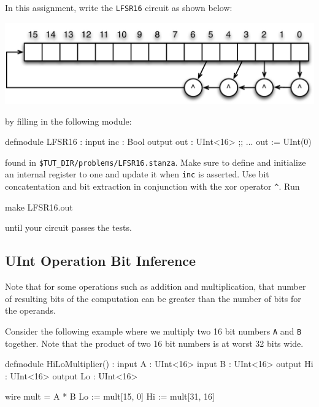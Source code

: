 \subsection{}

In this assignment, write the \verb+LFSR16+ circuit as shown below:

\begin{center}
\includegraphics[width=0.9\columnwidth]{../bootcamp/figs/LFSR16.pdf}
\end{center}

\noindent
by filling in the following module:

\begin{stanza}
defmodule LFSR16 :
  input  inc : Bool
  output out : UInt<16>
  ;; ...
  out := UInt(0)
\end{stanza}

\noindent
found in \verb+$TUT_DIR/problems/LFSR16.stanza+.
Make sure to define and initialize an internal register to one and 
update it when \verb+inc+ is asserted.
Use bit concatentation and bit extraction 
in conjunction with the xor operator \verb+^+.  Run 

\begin{bash}
make LFSR16.out
\end{bash}

\noindent 
until your circuit passes the tests.

\subsection{UInt Operation Bit Inference}

Note that for some operations such as addition and multiplication, that number of resulting bits of the computation can be greater than the number of bits for the operands. 

Consider the following example where we multiply two 16 bit numbers \verb+A+ and \verb+B+ together. Note that the product of two 16 bit numbers is at worst 32 bits wide.

\begin{stanza}
defmodule HiLoMultiplier() :
  input A   : UInt<16>
  input B   : UInt<16>
  output Hi : UInt<16>
  output Lo : UInt<16>

  wire mult = A * B
  Lo := mult[15, 0]
  Hi := mult[31, 16]
\end{stanza}

